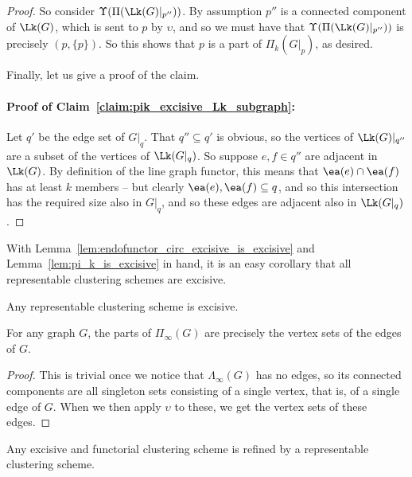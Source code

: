 \documentclass[a4paper,reqno,oneside]{article} %
\begin{document}
\begin{proof}
    So consider $\Upsilon(\Pi(\Lk(G)|_{p''}))$. By assumption $p''$ is a connected component of $\Lk(G)$, which is sent to $p$ by $\upsilon$, and so we must have that $\Upsilon(\Pi(\Lk(G)|_{p''}))$ is precisely $(p,\{p\})$. So this shows that $p$ is a part of $\Pi_k(G|_p)$, as desired.

    Finally, let us give a proof of the claim.

    \paragraph*{Proof of Claim~\ref{claim:pik_excisive_Lk_subgraph}:} Let $q'$ be the edge set of $G|_q$. That $q'' \subseteq q'$ is obvious, so the vertices of $\Lk(G)|_{q''}$ are a subset of the vertices of $\Lk(G|_q)$. So suppose $e, f \in q''$ are adjacent in $\Lk(G)$. By definition of the line graph functor, this means that $\ea(e)\cap\ea(f)$ has at least $k$ members -- but clearly $\ea(e), \ea(f) \subseteq q$, and so this intersection has the required size also in $G|_q$, and so these edges are adjacent also in $\Lk(G|_q)$.
\end{proof}

With Lemma~\ref{lem:endofunctor_circ_excisive_is_excisive} and Lemma~\ref{lem:pi_k_is_excisive} in hand, it is an easy corollary that all representable clustering schemes are excisive.

\begin{lemma} \label{lemma_repr_implies_excisive}
    Any representable clustering scheme is excisive.
\end{lemma}

\begin{lemma} \label{lemma_pi_infty_parts}
    For any graph $G$, the parts of $\Pi_\infty(G)$ are precisely the vertex sets of the edges of $G$.
\end{lemma}
\begin{proof}
    This is trivial once we notice that $\Lambda_\infty(G)$ has no edges, so its connected components are all singleton sets consisting of a single vertex, that is, of a single edge of $G$. When we then apply $\upsilon$ to these, we get the vertex sets of these edges.
\end{proof}

\begin{lemma} \label{lemma_exc_and_funct_implies_repr}
    Any excisive and functorial clustering scheme is refined by a representable clustering scheme.
\end{lemma}
\end{document}

